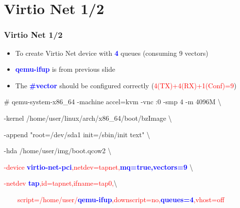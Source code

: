 \documentclass[aspectratio=169]{beamer}
\begin{document}
\section{Virtio Net 1/2}
\begin{frame}
\frametitle{Virtio Net 1/2}
\begin{itemize}
\item To create Virtio Net device with \textbf{\textcolor{blue}{4}} queues (consuming 9 vectors)
\item \textbf{\textcolor{blue}{qemu-ifup}} is from previous slide
\item The \textbf{\textcolor{blue}{\#vector}} should be configured correctly (\textcolor{red}{4(TX)+4(RX)+1(Conf)=9})
\end{itemize}
\begin{block}{}
\# qemu-system-x86\_64 -machine accel=kvm -vnc :0 -smp 4 -m 4096M \textbackslash

-kernel /home/user/linux/arch/x86\_64/boot/bzImage \textbackslash
	
-append "root=/dev/sda1 init=/sbin/init text" \textbackslash

-hda /home/user/img/boot.qcow2 \textbackslash

\textcolor{red}{-device \textbf{\textcolor{blue}{virtio-net-pci}},netdev=tapnet,\textbf{\textcolor{blue}{mq=true,vectors=9}}} \textbackslash

\textcolor{red}{-netdev \textbf{\textcolor{blue}{tap}},id=tapnet,ifname=tap0,}\textbackslash

\textcolor{red}{\ \ \ \ script=/home/user/\textbf{\textcolor{blue}{qemu-ifup}},downscript=no,\textbf{\textcolor{blue}{queues=4}},vhost=off}

\end{block}
\end{frame}

\end{document}

